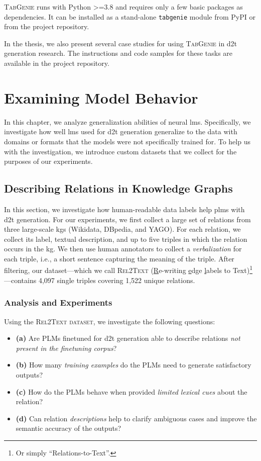 \documentclass[12pt,notitlepage,a4paper,oneside,openany]{report}
\begin{document}
\textsc{TabGenie} runs with Python >=3.8 and requires only a few basic packages as dependencies. It can be installed as a stand-alone \texttt{tabgenie} module from PyPI or from the project repository.


In the thesis, we also present several case studies for using \textsc{TabGenie} in \ac{d2t} generation research. The instructions and code samples for these tasks are available in the project repository.


\chapter{Examining Model Behavior}
\label{chap:investigating}

In this chapter, we analyze generalization abilities of neural \acp{lm}. Specifically, we investigate how well \acp{lm} used for \ac{d2t} generation generalize to the data with domains or formats that the models were not specifically trained for. To help us with the investigation, we introduce custom datasets that we collect for the purposes of our experiments.

\section{Describing Relations in Knowledge Graphs}
\label{sec:rel2text}

In this section, we investigate how human-readable data labels help \acp{plm} with \ac{d2t} generation. For our experiments, we first collect a large set of relations from three large-scale \acp{kg} (Wikidata, DBpedia, and YAGO). For each relation, we collect its label, textual description, and up to five triples in which the relation occurs in the \ac{kg}. We then use human annotators to collect a \emph{verbalization} for each triple, i.e., a short sentence capturing the meaning of the triple. After filtering, our dataset---which we call \textsc{Rel2Text} (\underline{R}e-writing \underline{e}dge \underline{l}abels to Text)\footnote{Or simply ``Relations-to-Text''.}---contains 4,097 single triples covering 1,522 unique relations.

\subsection{Analysis and Experiments}
\label{sec:rel2text:analysis}
Using the \textsc{Rel2Text dataset}, we investigate the following questions:
\begin{itemize}
    \item \textbf{(a)} Are PLMs finetuned for \ac{d2t} generation able to describe relations \textit{not present in the finetuning corpus}?
    \item \textbf{(b)} How many \textit{training examples} do the PLMs need to generate satisfactory outputs?
    \item \textbf{(c)} How do the PLMs behave when provided \textit{limited lexical cues} about the relation?
    \item \textbf{(d)} Can relation \textit{descriptions} help to clarify ambiguous cases and improve the semantic accuracy of the outputs?
\end{itemize}
\end{document}
